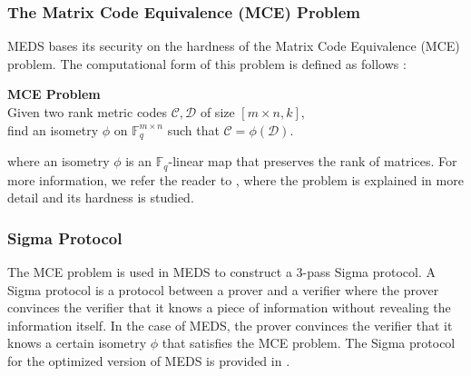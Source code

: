 \documentclass[11pt,a4paper]{report}
\begin{document}
\subsubsection{The Matrix Code Equivalence (MCE) Problem}
MEDS bases its security on the hardness of the Matrix Code Equivalence (MCE) problem. The computational form of this problem is defined as follows \cite{chou2023meds}:
\begin{center}
  \textbf{MCE Problem}\\
  Given two rank metric codes $\mathcal{C}, \mathcal{D}$ of size $[m \times n, k]$,\\
  find an isometry $\phi$ on $\mathbb{F}_q^{m \times n}$ such that $\mathcal{C} = \phi(\mathcal{D})$.
\end{center}
where an isometry $\phi$ is an $\mathbb{F}_q$-linear map that preserves the rank of matrices. For more information, we refer the reader to \cite{reijnders2024hardness}, where the problem is explained in more detail and its hardness is studied.

\subsubsection{Sigma Protocol}
The MCE problem is used in MEDS to construct a 3-pass Sigma protocol. A Sigma protocol is a protocol between a prover and a verifier where the prover convinces the verifier that it knows a piece of information without revealing the information itself. In the case of MEDS, the prover convinces the verifier that it knows a certain isometry $\phi$ that satisfies the MCE problem. The Sigma protocol for the optimized version of MEDS is provided in \cite{chou2024reducing}.

\end{document}
